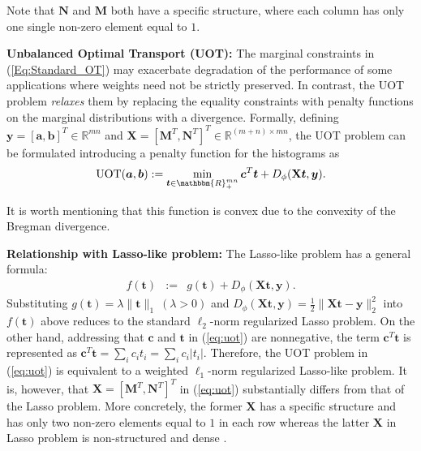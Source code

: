 \documentclass[twoside]{article}
\theoremstyle{plain}
\newcommand{\R}{\mathbbm{R}}
\newcommand{\mat}[1]{\mathbf{#1}}
\renewcommand{\vec}[1]{\bm{#1}}
\begin{document}
Note that $\mat{N}$ and $\mat{M}$ both have a specific structure, where each column has only one single non-zero element equal to $1$. 

 
{\bf Unbalanced Optimal Transport (UOT):} The marginal constraints in (\ref{Eq:Standard_OT}) may exacerbate degradation of the performance of some applications where weights need not be strictly preserved. In contrast, the UOT problem {\it relaxes} them by replacing the equality constraints with penalty functions on the marginal distributions with a divergence. Formally, defining $\vec{y} = [\vec{a}, \vec{b}]^T \in \mathbb{R}^{mn}$ and $\mat{X} = [\mat{M}^T,\mat{N}^T]^T \in \mathbb{R}^{(m+n) \times mn}$, the UOT problem can be formulated introducing a penalty function for the histograms as \citep{Chapel_NeurIPS_2021}
\begin{equation}
\label{eq:uot}
\operatorname{UOT}(\vec{a},\vec{b}) := \min_{\vec{t} \in \R_{+}^{mn}} \vec{c}^T\vec{t} + D_\phi(\mat{X}\vec{t},\vec{y}).
\end{equation}

It is worth mentioning that this function is convex due to the convexity of the Bregman divergence.

{\bf Relationship with Lasso-like problem:} 
The Lasso-like problem has a general formula:
%
\begin{eqnarray*}
f(\vec{t}) &:=& g(\vec{t}) + D_\phi(\mat{X} \vec{t},\vec{y}).
\end{eqnarray*}
Substituting $g(\vec{t}) = \lambda \|\vec{t}\|_1~(\lambda > 0)$ and $D_\phi(\mat{X} \vec{t},\vec{y}) = \frac{1}{2}\|\mat{X} \vec{t}-\vec{y}\|_2^2$ into $f(\vec{t})$ above reduces to the standard $\ell_2$-norm regularized Lasso problem. On the other hand, addressing that $\vec{c}$ and $\vec{t}$ in (\ref{eq:uot}) are nonnegative, the term $\vec{c}^T\vec{t}$ is represented as $\vec{c}^T\vec{t}=\sum_i c_i t_i = \sum_ic_i |t_i|$. Therefore, the UOT problem in (\ref{eq:uot}) is equivalent to a weighted $\ell_1$-norm regularized Lasso-like problem. It is, however, that $\mat{X} = [\mat{M}^T,\mat{N}^T]^T$ in (\ref{eq:uot}) substantially differs from that of the Lasso problem. More concretely, the former $\mat{X}$ has a specific structure and has only two non-zero elements equal to $1$ in each row whereas the latter $\mat{X}$ in Lasso problem is non-structured and dense \citep{Chapel_NeurIPS_2021}.
\end{document}
